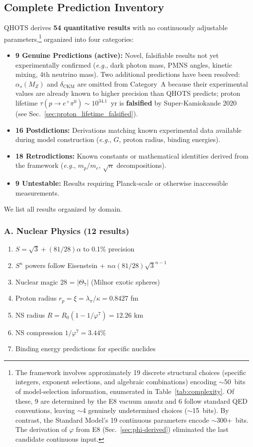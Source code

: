 \documentclass[aps,prd,twocolumn,superscriptaddress,floatfix,nofootinbib]{revtex4-2}
\theoremstyle{definition}
\theoremstyle{remark}
\newcommand{\vp}{\varphi}
\newcommand{\Th}{\Theta}
\newcommand{\eg}{\textit{e.g.}}
\begin{document}
\subsection{Complete Prediction Inventory}

QHOTS derives \textbf{54 quantitative results} with no continuously adjustable parameters,\footnote{The framework involves approximately 19 discrete structural choices (specific integers, exponent selections, and algebraic combinations) encoding $\sim$50~bits of model-selection information, enumerated in Table~\ref{tab:complexity}. Of these, 9 are determined by the E8 vacuum ansatz and 6 follow standard QED conventions, leaving $\sim$4 genuinely undetermined choices ($\sim$15~bits). By contrast, the Standard Model's 19 continuous parameters encode $\sim$300+~bits. The derivation of $\vp$ from E8 (Sec.~\ref{sec:phi-derived}) eliminated the last candidate continuous input.} organized into four categories:
\begin{itemize}
\item \textbf{9 Genuine Predictions (active):} Novel, falsifiable results not yet experimentally confirmed (\eg, dark photon mass, PMNS angles, kinetic mixing, 4th neutrino mass). Two additional predictions have been resolved: $\alpha_s(M_Z)$ and $\delta_\text{CKM}$ are omitted from Category~A because their experimental values are already known to higher precision than QHOTS predicts; proton lifetime $\tau(p \to e^+\pi^0) \sim 10^{34.1}$~yr is \textbf{falsified} by Super-Kamiokande 2020 (see Sec.~\ref{sec:proton_lifetime_falsified}).
\item \textbf{16 Postdictions:} Derivations matching known experimental data available during model construction (\eg, $G$, proton radius, binding energies).
\item \textbf{18 Retrodictions:} Known constants or mathematical identities derived from the framework (\eg, $m_p/m_e$, $\sqrt{n}$ decompositions).
\item \textbf{9 Untestable:} Results requiring Planck-scale or otherwise inaccessible measurements.
\end{itemize}
\noindent We list all results organized by domain.

\subsubsection{A. Nuclear Physics (12 results)}

\begin{enumerate}
\item[\#1] $S = \sqrt{3} + (81/28)\alpha$ to 0.1\% precision
\item[\#2] $S^n$ powers follow Eisenstein + $n\alpha(81/28)\sqrt{3}^{n-1}$
\item[\#3] Nuclear magic 28 = $|\Th_7|$ (Milnor exotic spheres)
\item[\#4] Proton radius $r_p = \xi = \lambda_\pi/\kappa = 0.8427$ fm
\item[\#5] NS radius $R = R_0(1 - 1/\vp^7) = 12.26$ km
\item[\#6] NS compression $1/\vp^7 = 3.44\%$
\item[\#7-12] Binding energy predictions for specific nuclides
\end{enumerate}
\end{document}
